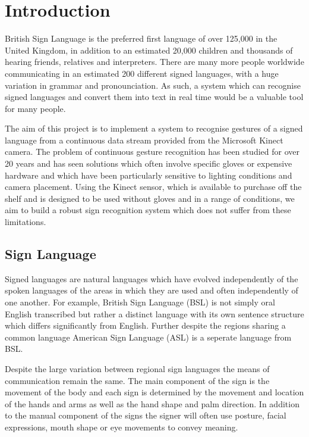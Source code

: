 \chapter{Introduction}
\ifpdf
    \graphicspath{{Introduction/IntroductionFigs/PNG/}{Introduction/IntroductionFigs/PDF/}{Introduction/IntroductionFigs/}}
\else
    \graphicspath{{Introduction/IntroductionFigs/EPS/}{Introduction/IntroductionFigs/}}
\fi

British Sign Language is the preferred first language of over 125,000 in the United Kingdom, in addition to an estimated 20,000 children and thousands of hearing friends, relatives and interpreters. There are many more people worldwide communicating in an estimated 200 different signed languages, with a huge variation in grammar and pronounciation. As such, a system which can recognise signed languages and convert them into text in real time would be a valuable tool for many people. 

The aim of this project is to implement a system to recognise gestures of a signed language from a continuous data stream provided from the Microsoft Kinect camera. The problem of continuous gesture recognition has been studied for over 20 years and has seen solutions which often involve specific gloves or expensive hardware and which have been particularly sensitive to lighting conditions and camera placement. Using the Kinect sensor, which is available to purchase off the shelf and is designed to be used without gloves and in a range of conditions, we aim to build a robust sign recognition system which does not suffer from these limitations.

\section{Sign Language}
Signed languages are natural languages which have evolved independently of the spoken languages of the areas in which they are used and often independently of one another. For example, British Sign Language (BSL) is not simply oral English transcribed but rather a distinct language with its own sentence structure which differs significantly from English. Further despite the regions sharing a common language American Sign Language (ASL) is a seperate language from BSL.

Despite the large variation between regional sign languages the means of communication remain the same. The main component of the sign is the movement of the body and each sign is determined by the movement and location of the hands and arms as well as the hand shape and palm direction. In addition to the manual component of the signs the signer will often use posture, facial expressions, mouth shape or eye movements to convey meaning.

